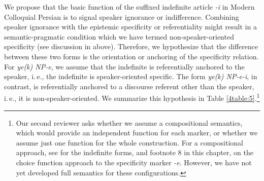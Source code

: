 \documentclass[output=paper]{langsci/langscibook}
\begin{document}
We propose that the basic function of the suffixed indefinite article {\emph{-i}} in Modern Colloquial Persian is to signal speaker ignorance or indifference. Combining speaker ignorance with the epistemic specificity or referentiality might result in a semantic-pragmatic condition which we have termed non-speaker-oriented specificity (see discussion in  above). Therefore, we hypothesize that the difference between these two forms is the orientation or anchoring of the specificity relation. For {\emph{ye(k) NP-e}}, we assume that the indefinite is referentially anchored to the speaker, i.\,e., the indefinite is speaker-oriented specific. The form {\emph{ye(k) NP-e-i}}, in contrast, is referentially anchored to a discourse referent other than the speaker, i.\,e., it is non-speaker-oriented. We summarize this hypothesis in Table \ref{4table:5}.\footnote{Our second reviewer asks whether we assume a compositional semantics, which would provide an independent function for each marker, or whether we assume just one function for the whole construction. For a compositional approach, see \cite{jasbi:16} for the indefinite forms, and footnote 8 in this chapter, on the choice function approach to the specificity marker {\emph{-e}}. However, we have not yet developed full semantics for these configurations.}

\begin{table}

\caption{Specificity marker {\emph{-e}} with different indefinite markers in Modern Colloquial Persian}\label{4table:5}
\end{table}
\end{document}
